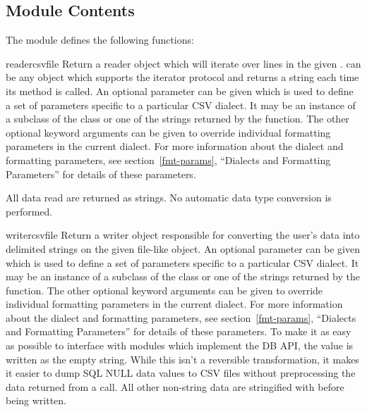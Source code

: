 \subsection{Module Contents}


The  module defines the following functions:

\begin{funcdesc}{reader}{csvfile}
Return a reader object which will iterate over lines in the given
{}.   can be any object which supports the
iterator protocol and returns a string each time its 
method is called.  An optional  parameter can be given
which is used to define a set of parameters specific to a particular CSV
dialect.  It may be an instance of a subclass of the 
class or one of the strings returned by the 
function.  The other optional {} keyword arguments can be
given to override individual formatting parameters in the current
dialect.  For more information about the dialect and formatting
parameters, see section~\ref{fmt-params}, ``Dialects and Formatting
Parameters'' for details of these parameters.

All data read are returned as strings.  No automatic data type
conversion is performed.
\end{funcdesc}

\begin{funcdesc}{writer}{csvfile}
Return a writer object responsible for converting the user's data into
delimited strings on the given file-like object.  An optional
{} parameter can be given which is used to define a set of
parameters specific to a particular CSV dialect.  It may be an instance
of a subclass of the  class or one of the strings
returned by the  function.  The other optional
{} keyword arguments can be given to override individual
formatting parameters in the current dialect.  For more information
about the dialect and formatting parameters, see
section~\ref{fmt-params}, ``Dialects and Formatting Parameters'' for
details of these parameters.  To make it as easy as possible to
interface with modules which implement the DB API, the value
 is written as the empty string.  While this isn't a
reversible transformation, it makes it easier to dump SQL NULL data values
to CSV files without preprocessing the data returned from a
 call.  All other non-string data are stringified
with  before being written.
\end{funcdesc}

